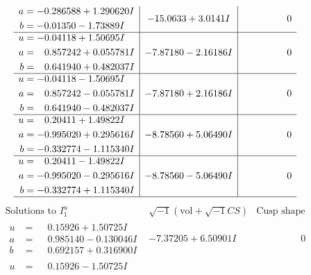 \documentclass[1p]{elsarticle_modified}
\theoremstyle{definition}
\newcommand{\I}{\sqrt{-1}}
\begin{document}
$$\begin{array}{c|c|c}
\begin{aligned}
a &= -0.286588 + 1.290620 I \\
b &= -0.01350 - 1.73889 I\end{aligned}
 & -15.0633 + 3.0141 I & \phantom{-0.000000 } 0 \\ \hline\begin{aligned}
u &= -0.04118 + 1.50695 I \\
a &= \phantom{-}0.857242 + 0.055781 I \\
b &= \phantom{-}0.641940 + 0.482037 I\end{aligned}
 & -7.87180 - 2.16186 I & \phantom{-0.000000 } 0 \\ \hline\begin{aligned}
u &= -0.04118 - 1.50695 I \\
a &= \phantom{-}0.857242 - 0.055781 I \\
b &= \phantom{-}0.641940 - 0.482037 I\end{aligned}
 & -7.87180 + 2.16186 I & \phantom{-0.000000 } 0 \\ \hline\begin{aligned}
u &= \phantom{-}0.20411 + 1.49822 I \\
a &= -0.995020 + 0.295616 I \\
b &= -0.332774 - 1.115340 I\end{aligned}
 & -8.78560 + 5.06490 I & \phantom{-0.000000 } 0 \\ \hline\begin{aligned}
u &= \phantom{-}0.20411 - 1.49822 I \\
a &= -0.995020 - 0.295616 I \\
b &= -0.332774 + 1.115340 I\end{aligned}
 & -8.78560 - 5.06490 I & \phantom{-0.000000 } 0\\
 \hline 
 \end{array}$$\newpage$$\begin{array}{c|c|c}  
\text{Solutions to }I^u_{1}& \I (\text{vol} + \sqrt{-1}CS) & \text{Cusp shape}\\
 \hline 
\begin{aligned}
u &= \phantom{-}0.15926 + 1.50725 I \\
a &= \phantom{-}0.985140 - 0.130046 I \\
b &= \phantom{-}0.692157 + 0.316900 I\end{aligned}
 & -7.37205 + 6.50901 I & \phantom{-0.000000 } 0 \\ \hline\begin{aligned}
u &= \phantom{-}0.15926 - 1.50725 I \\

\end{aligned}
\end{array}$$
\end{document}
